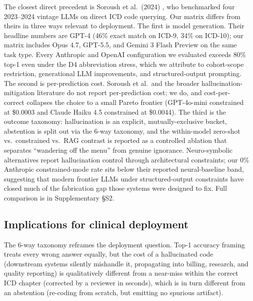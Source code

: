 The closest direct precedent is Soroush et al.~(2024)
\autocite{Soroush2024}, who benchmarked four 2023--2024 vintage
LLMs on direct ICD code querying. Our matrix differs from theirs in
three ways relevant to deployment. The first is model generation.
Their headline numbers are GPT-4 (46\% exact match on ICD-9, 34\%
on ICD-10); our matrix includes Opus 4.7, GPT-5.5, and Gemini 3
Flash Preview on the same task type. Every Anthropic and OpenAI
configuration we evaluated exceeds 80\% top-1 even under the D4
abbreviation stress, which we attribute to cohort-scope
restriction, generational LLM improvements, and structured-output
prompting. The second is per-prediction cost. Soroush et al.\ and
the broader hallucination-mitigation literature
\autocite{DasBaksi2024,Sarvari2025,Motzfeldt2025,HybridCode2025} do
not report per-prediction cost; we do, and cost-per-correct
collapses the choice to a small Pareto frontier (GPT-4o-mini
constrained at \$0.0003 and Claude Haiku 4.5 constrained at
\$0.0044). The third is the outcome taxonomy: hallucination is an
explicit, mutually-exclusive bucket, abstention is split out via
the 6-way taxonomy, and the within-model zero-shot vs.\ constrained
vs.\ RAG contrast is reported as a controlled ablation that
separates ``wandering off the menu'' from genuine ignorance.
Neuro-symbolic alternatives \autocite{Motzfeldt2025,HybridCode2025}
report hallucination control through architectural constraints;
our 0\% Anthropic constrained-mode rate sits below their reported
neural-baseline band, suggesting that modern frontier LLMs under
structured-output constraints have closed much of the fabrication
gap those systems were designed to fix. Full comparison is in
Supplementary §S2.

\subsection{Implications for clinical deployment}\label{implications-for-clinical-deployment}

The 6-way taxonomy reframes the deployment question. Top-1
accuracy framing treats every wrong answer equally, but the cost
of a hallucinated code (downstream systems silently mishandle it,
propagating into billing, research, and quality reporting) is
qualitatively different from a near-miss within the correct ICD
chapter (corrected by a reviewer in seconds), which is in turn
different from an abstention (re-coding from scratch, but
emitting no spurious artifact).


